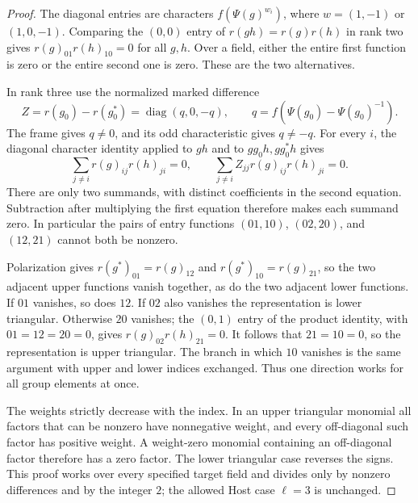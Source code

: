 \begin{proof}
The diagonal entries are characters
\(f(\Psi(g)^{w_i})\), where
\(w=(1,-1)\) or \((1,0,-1)\).  Comparing the \((0,0)\)
entry of \(r(gh)=r(g)r(h)\) in rank two gives
\(r(g)_{01}r(h)_{10}=0\) for all \(g,h\).  Over a field,
either the entire first function is zero or the entire second one
is zero.  These are the two alternatives.

In rank three use the normalized marked difference
\[
 Z=r(g_0)-r(g_0^*)=\operatorname{diag}(q,0,-q),
 \qquad q=f(\Psi(g_0)-\Psi(g_0)^{-1}).                       \tag{APD.16}
\]
The frame gives \(q\ne0\), and its odd characteristic gives
\(q\ne-q\).  For every \(i\), the diagonal character identity
applied to \(gh\) and to
\(gg_0h,gg_0^*h\) gives
\[
 \sum_{j\ne i}r(g)_{ij}r(h)_{ji}=0,
 \qquad
 \sum_{j\ne i}Z_{jj}r(g)_{ij}r(h)_{ji}=0.                 \tag{APD.17}
\]
There are only two summands, with distinct coefficients in the
second equation.  Subtraction after multiplying the first equation
therefore makes each summand zero.  In particular the pairs of
entry functions \((01,10)\), \((02,20)\), and \((12,21)\)
cannot both be nonzero.

Polarization gives \(r(g^*)_{01}=r(g)_{12}\) and
\(r(g^*)_{10}=r(g)_{21}\), so the two adjacent upper functions
vanish together, as do the two adjacent lower functions.  If
\(01\) vanishes, so does \(12\).  If \(02\) also vanishes
the representation is lower triangular.  Otherwise \(20\)
vanishes; the \((0,1)\) entry of the product identity, with
\(01=12=20=0\), gives
\(r(g)_{02}r(h)_{21}=0\).  It follows that \(21=10=0\),
so the representation is upper triangular.  The branch in which
\(10\) vanishes is the same argument with upper and lower
indices exchanged.  Thus one direction works for all group
elements at once.

The weights strictly decrease with the index.  In an upper
triangular monomial all factors that can be nonzero have
nonnegative weight, and every off-diagonal such factor has
positive weight.  A weight-zero monomial containing an
off-diagonal factor therefore has a zero factor.  The lower
triangular case reverses the signs.  This proof works over every
specified target field and divides only by nonzero differences
and by the integer \(2\); the allowed Host case \(\ell=3\)
is unchanged.
\end{proof}

